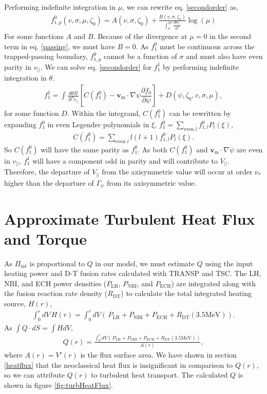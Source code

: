 \documentclass[aip, pop, preprint]{revtex4-1}
\numberwithin{figure}{section}
\numberwithin{equation}{section}
\newcommand{\partder}[2]{\dfrac{\partial  #1}{\partial  #2}} %
\begin{document}
Performing indefinite integration in $\mu$, we can rewrite eq. \ref{secondorder} as,
\begin{gather}
f_{1,p}^0(v, \sigma, \mu, \zeta_0) = A(v, \sigma, \zeta_0) + \frac{B(v, \sigma, \zeta_0)}{\int_0^{2\pi} \frac{d \theta v_{||}}{B^{\theta}}} \log(\mu)
\label{passing}
\end{gather}
For some functions $A$ and $B$. Because of the divergence at $\mu=0$ in the second term in eq. \ref{passing}, we must have $B = 0$. As $f_1^0$ must be continuous across the trapped-passing boundary, $f_{1,p}^0$ cannot be a function of $\sigma$ and must also have even parity in $v_{||}$. We can solve eq. \ref{secondorder} for $f_1^1$ by performing indefinite integration in $\theta$. 
\begin{gather}
f_{1}^1 = \int \frac{d \theta B}{B^{\theta} v_{||}} \left[C(f_1^0) - \bm{v}_{\text{m}} \cdot \nabla \psi \partder{f_0}{\psi} \right] + D(\psi, \zeta_0, v, \sigma, \mu),
\end{gather}
for some function $D$. Within the integrand, $C(f_1^0)$ can be rewritten by expanding $f_1^0$ in even Legendre polynomials in $\xi$, $f_1^0 = \sum_{\text{even }l} f_{1,l}^0 P_l(\xi)$,
\begin{gather}
C(f_1^0) = \sum_{\text{even }l} l(l+1) f_{1,l}^0 P_l(\xi).
\end{gather}
So $C(f_1^0)$ will have the same parity as $f_1^0$. As both $C(f_1^0)$ and $\bm{v}_{\text{m}} \cdot \nabla \psi$ are even in $v_{||}$, $f_1^1$ will have a component odd in parity and will contribute to $V_{||}$. Therefore, the departure of $V_{||}$ from the axisymmetric value will occur at order $\nu_*$ higher than the departure of $\Gamma_{\psi}$ from its axisymmetric value.

\section{Approximate Turbulent Heat Flux and Torque}\label{turbQ}

As $\Pi_{\text{int}}$ is proportional to $Q$ in our model, we must estimate $Q$ using the input heating power and D-T fusion rates calculated with TRANSP and TSC. The LH, NBI, and ECH power densities ($P_{\text{LH}}$, $P_{\text{NBI}}$, and $P_{\text{ECH}}$) are integrated along with the fusion reaction rate density ($R_{\text{DT}}$) to calculate the total integrated heating source, $H(r)$,
\begin{gather}
\int_0^r dV \, H(r) = \int_0^r dV \left(\, P_{\text{LH}} + P_{\text{NBI}} + P_{\text{ECH}} + R_{\text{DT}} (3.5 \text{MeV}) \right).
\end{gather}
As $\int Q \cdot dS = \int H dV$, 
\begin{gather}
Q(r) = \frac{\int_0^r dV \left(\, P_{\text{LH}} + P_{\text{NBI}} + P_{\text{ECH}} + R_{\text{DT}} (3.5 \text{MeV}) \right)}{A(r)},
\end{gather}
where $A(r) = V'(r)$ is the flux surface area. We have shown in section \ref{heatflux} that the neoclassical heat flux is insignificant in comparison to $Q(r)$, so we can attribute $Q(r)$ to turbulent heat transport. The calculated $Q$ is shown in figure \ref{fig:turbHeatFlux}.
\end{document}
